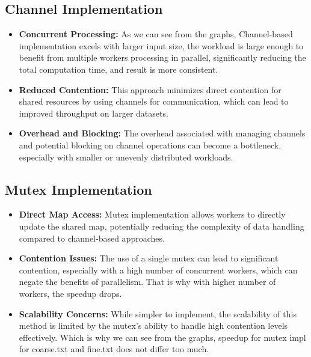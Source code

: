 \documentclass[letterpaper,12pt]{article}
\theoremstyle{remark}
\begin{document}
\subsection{Channel Implementation}
\begin{itemize}
    \item \textbf{Concurrent Processing:} As we can see from the graphs, Channel-based implementation excels with larger input size,  the workload is large enough to benefit from multiple workers processing in parallel, significantly reducing the total computation time, and result is more consistent.
    \item \textbf{Reduced Contention:} This approach minimizes direct contention for shared resources by using channels for communication, which can lead to improved throughput on larger datasets.
    \item \textbf{Overhead and Blocking:} The overhead associated with managing channels and potential blocking on channel operations can become a bottleneck, especially with smaller or unevenly distributed workloads.
\end{itemize}

\subsection{Mutex Implementation}
\begin{itemize}
    \item \textbf{Direct Map Access:} Mutex implementation allows workers to directly update the shared map, potentially reducing the complexity of data handling compared to channel-based approaches. 
     \item \textbf{Contention Issues:} The use of a single mutex can lead to significant contention, especially with a high number of concurrent workers, which can negate the benefits of parallelism. That is why with higher number of workers, the speedup drops.
    \item \textbf{Scalability Concerns:} While simpler to implement, the scalability of this method is limited by the mutex's ability to handle high contention levels effectively. Which is why we can see from the graphs, speedup for mutex impl for coarse.txt and fine.txt does not differ too much.
\end{itemize}
\end{document}
